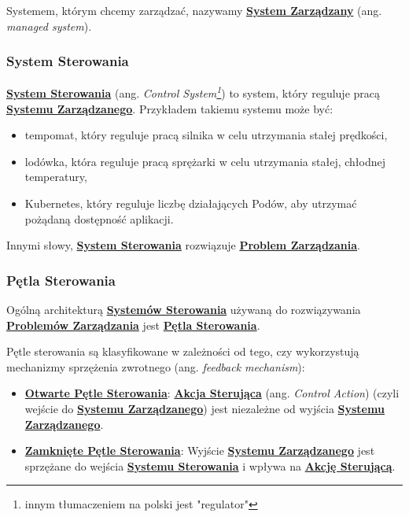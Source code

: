 Systemem, którym chcemy zarządzać, nazywamy \hyperlink{def:system-zarzadzany}{\textbf{System Zarządzany}} (ang. \textit{managed system}).

\subsubsection{System Sterowania}

\hyperlink{def:system-sterowania}{\textbf{System Sterowania}} (ang. \textit{Control System\footnote{innym tłumaczeniem na polski jest "regulator"}}) to system, który reguluje pracą \hyperlink{def:system-zarzadzany}{\textbf{Systemu Zarządzanego}}. Przykładem takiemu systemu może być:
\begin{itemize}
    \item tempomat, który reguluje pracą silnika w celu utrzymania stałej prędkości,
    \item lodówka, która reguluje pracą sprężarki w celu utrzymania stałej, chłodnej temperatury,
    \item Kubernetes, który reguluje liczbę działających Podów, aby utrzymać pożądaną dostępność aplikacji.
\end{itemize}

Innymi słowy, \hyperlink{def:system-sterowania}{\textbf{System Sterowania}} rozwiązuje \hyperlink{def:problem-zarzadzania}{\textbf{Problem Zarządzania}}.

\subsubsection{Pętla Sterowania}

Ogólną architekturą \hyperlink{def:system-sterowania}{\textbf{Systemów Sterowania}} używaną do rozwiązywania \hyperlink{def:problem-zarzadzania}{\textbf{Problemów Zarządzania}} jest \hyperlink{def:petla-sterowania}{\textbf{Pętla Sterowania}}.

Pętle sterowania są klasyfikowane w zależności od tego, czy wykorzystują mechanizmy sprzężenia zwrotnego (ang. \textit{feedback mechanism}):
\begin{itemize}
    \item \hyperlink{def:petla-sterowania}{\textbf{Otwarte Pętle Sterowania}}: \hyperlink{def:akcja-sterujaca}{\textbf{Akcja Sterująca}} (ang. \textit{Control Action}) (czyli wejście do \hyperlink{def:system-zarzadzany}{\textbf{Systemu Zarządzanego}}) jest niezależne od wyjścia \hyperlink{def:system-zarzadzany}{\textbf{Systemu Zarządzanego}}.
    \item \hyperlink{def:zamknieta-petla-sterowania}{\textbf{Zamknięte Pętle Sterowania}}: Wyjście \hyperlink{def:system-zarzadzany}{\textbf{Systemu Zarządzanego}} jest sprzężane do wejścia \hyperlink{def:system-sterowania}{\textbf{Systemu Sterowania}} i wpływa na \hyperlink{def:akcja-sterujaca}{\textbf{Akcję Sterującą}}. 
\end{itemize}

